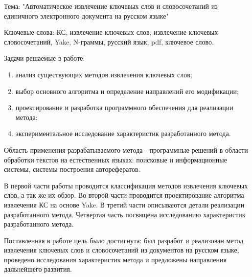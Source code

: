 \begin{essay}{}
Тема: "Автоматическое извлечение ключевых слов и словосочетаний из единичного электронного документа на русском языке"

Ключевые слова: КС, извлечение ключевых слов, извлечение ключевых словосочетаний, Yake, N-граммы, русский язык, pdf, ключевое слово.

Задачи решаемые в работе:
\begin{enumerate}
	\item анализ существующих методов извлечения ключевых слов;
	\item выбор основного алгоритма и определение направлений его модификации;
	\item проектирование и разработка программного обеспечения для реализации метода;
	\item экспериментальное исследование характеристик разработанного метода.
\end{enumerate}

Область применения разрабатываемого метода -  программные решений в области обработки текстов на естественных языках: поисковые и информационные системы, системы построения авторефератов.

В первой части работы проводится классификация методов извлечения ключевых слов, а так же их обзор.
Во второй части проводится проектирование алгоритма извлечения КС на основе Yake.
В третий части описываются детали реализации разработанного метода.
Четвертая часть посвящена исследованию характеристик разработанного метода.

Поставленная в работе цель было достигнута: был разработ и реализован метод извлечения ключевых слов и словосочетаний из документов на русском языке, проведено исследования характеристик метода и предложены направления дальнейшего развития.
\end{essay}





